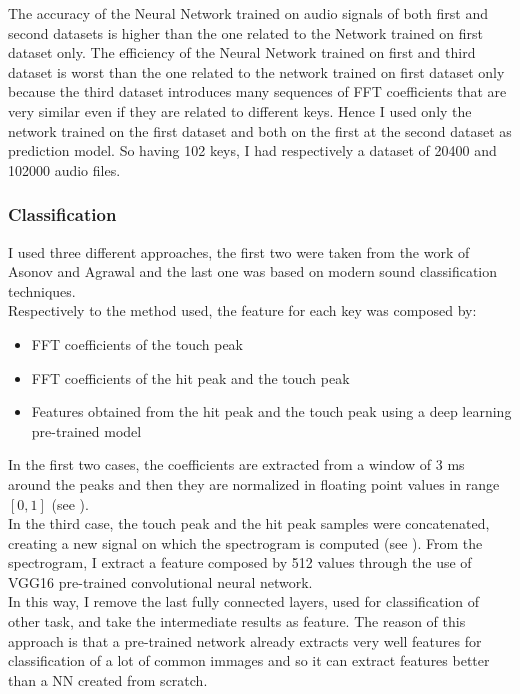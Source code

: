 The accuracy of the Neural Network trained on audio signals of both first and second datasets is higher than the one related to the Network trained on first dataset only.  The efficiency of the Neural Network trained on first and third dataset is worst than the one related to the network trained on first dataset only because the third dataset introduces many sequences of FFT coefficients that are very similar even if they are related to different keys. Hence I used only the network trained on the first dataset and both on the first at the second dataset as prediction model. So having 102 keys, I had respectively a dataset of 20400 and 102000 audio files.

\subsubsection{Classification}
I used three different approaches, the first two were taken from the work of Asonov and Agrawal and the last one was based on modern sound classification techniques.\\
Respectively to the method used, the feature for each key was composed by:
\begin{itemize}
\item{FFT coefficients of the touch peak}
\item{FFT coefficients of the hit peak and the touch peak}
\item{Features obtained from the hit peak and the touch peak using a deep learning pre-trained model}
\end{itemize}
In the first two cases, the coefficients are extracted from a window of 3 ms around the peaks and then they are normalized in floating point values in range $[0, 1]$ (see ).\\
In the third case, the touch peak and the hit peak samples were concatenated, creating a new signal on which the spectrogram is computed (see ). From the spectrogram, I extract a feature composed by 512 values through the use of VGG16 pre-trained convolutional neural network.\\
In this way, I remove the last fully connected layers, used for classification of other task, and take the intermediate results as feature. The reason of this approach is that a pre-trained network already extracts very well features for classification of a lot of common immages and so it can extract features better than a NN created from scratch.
